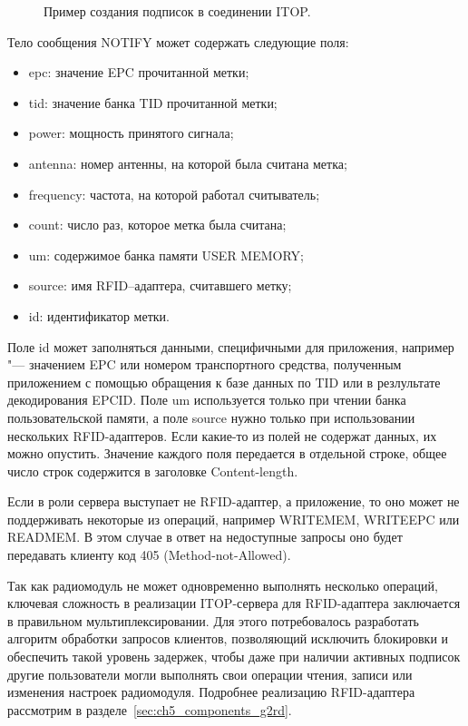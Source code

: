\begin{figure}[ht]
  \caption{Пример создания подписок в соединении ITOP.}
  \label{fig:ch5_itop_session_2}
\end{figure}

Тело сообщения NOTIFY может содержать следующие поля:

\begin{itemize}
	\item epc: значение EPC прочитанной метки;
	\item tid: значение банка TID прочитанной метки;
	\item power: мощность принятого сигнала;
	\item antenna: номер антенны, на которой была считана метка;
	\item frequency: частота, на которой работал считыватель;
	\item count: число раз, которое метка была считана;
	\item um: содержимое банка памяти USER MEMORY;
	\item source: имя RFID--адаптера, считавшего метку;
	\item id: идентификатор метки.
\end{itemize}

Поле id может заполняться данными, специфичными для приложения, например "--- значением EPC или номером транспортного средства, полученным приложением с помощью обращения к базе данных по TID или в резлультате декодирования EPCID. Поле um используется только при чтении банка пользовательской памяти, а поле source нужно только при использовании нескольких RFID-адаптеров. Если какие-то из полей не содержат данных, их можно опустить. Значение каждого поля передается в отдельной строке, общее число строк содержится в заголовке Content-length.

Если в роли сервера выступает не RFID-адаптер, а приложение, то оно может не поддерживать некоторые из операций, например WRITEMEM, WRITEEPC или READMEM. В этом случае в ответ на недоступные запросы оно будет передавать клиенту код 405 (Method-not-Allowed).

Так как радиомодуль не может одновременно выполнять несколько операций, ключевая сложность в реализации ITOP-сервера для RFID-адаптера заключается в правильном мультиплексировании. Для этого потребовалось разработать алгоритм обработки запросов клиентов, позволяющий исключить блокировки и обеспечить такой уровень задержек, чтобы даже при наличии активных подписок другие пользователи могли выполнять свои операции чтения, записи или изменения настроек радиомодуля. Подробнее реализацию RFID-адаптера рассмотрим в разделе~\ref{sec:ch5_components_g2rd}.


